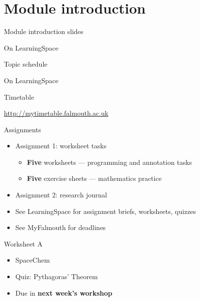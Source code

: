 \part{Module introduction}
\frame{\partpage}

\begin{frame}{Module introduction slides}
\begin{center}
On LearningSpace
\end{center}
\end{frame}

\begin{frame}{Topic schedule}
	\begin{center}
		On LearningSpace
	\end{center}
\end{frame}

\begin{frame}{Timetable}
	\begin{center}
		\url{http://mytimetable.falmouth.ac.uk}
	\end{center}
\end{frame}

\begin{frame}{Assignments}
	\begin{itemize}
		\pause\item Assignment 1: worksheet tasks
			\begin{itemize}
				\pause\item \textbf{Five} worksheets --- programming and annotation tasks
				\pause\item \textbf{Five} exercise sheets --- mathematics practice
			\end{itemize}
		\pause\item Assignment 2: research journal
		\pause\item See LearningSpace for assignment briefs, worksheets, quizzes
		\pause\item See MyFalmouth for deadlines
	\end{itemize}
\end{frame}

\begin{frame}{Worksheet A}
	\begin{itemize}
		\item SpaceChem
		\item Quiz: Pythagoras' Theorem
		\item Due in \textbf{next week's workshop}
	\end{itemize}
\end{frame}
